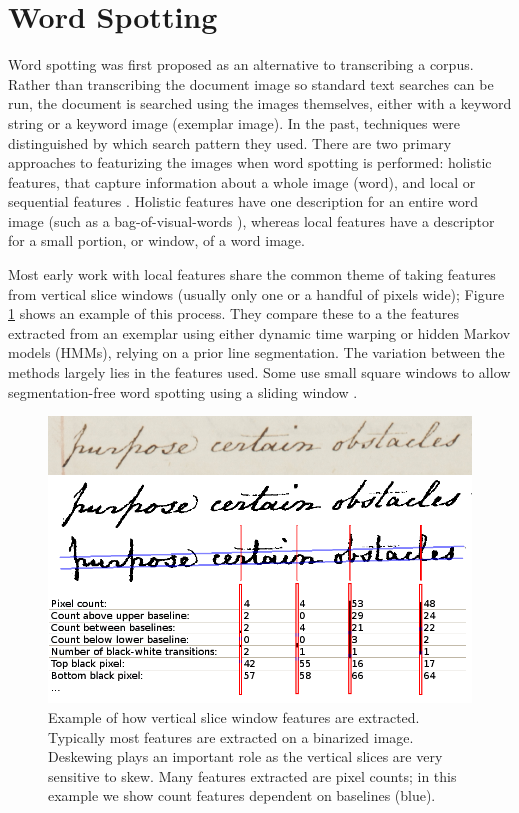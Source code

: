 \documentclass[ms,electronic,twosidetoc,letterpaper,chaptercenter,parttop,lol,lof,lot]{byumsphd}
\begin{document}
\section{Word Spotting}\label{relatedwork_wordspotting}


Word spotting was first proposed as an alternative to transcribing a corpus. Rather than transcribing the document image so standard text searches can be run, the document is searched using the images themselves, either with a keyword string or a keyword image (exemplar image). In the past, techniques were distinguished by which search pattern they used. There are two primary approaches to featurizing the images when word spotting is performed: holistic features, that capture information about a whole image (word), and local or sequential features \cite{Rodrıguez2008}. Holistic features have one description for an entire word image (such as a bag-of-visual-words \cite{Shekhar2012}), whereas local features have a descriptor for a small portion, or window, of a word image. 

Most early work with local features share the common theme of taking features from vertical slice windows (usually only one or a handful of pixels wide); Figure \ref{fig:vertslice} shows an example of this process. They compare these to a the features extracted from an exemplar using either dynamic time warping or hidden Markov models (HMMs), relying on a prior line segmentation. The variation between the methods largely lies in the features used. Some use small square windows to allow segmentation-free word spotting using a sliding window \cite{Rothacker2013}.

\begin{figure}[t]
    \centering
    \includegraphics[width=.9\textwidth]{vertwind}
    \caption{Example of how vertical slice window features are extracted. Typically most features are extracted on a binarized image. Deskewing plays an important role as the vertical slices are very sensitive to skew. Many features extracted are pixel counts; in this example we show count features dependent on baselines (blue).}
    \label{fig:vertslice}
\end{figure}
\end{document}

